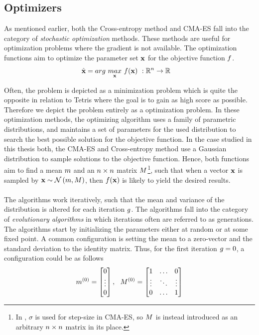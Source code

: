 \subsection{Optimizers \label{Optimizers}}

As mentioned earlier, both the Cross-entropy method and CMA-ES fall into the category of 
\textit{stochastic optimization}
methods. These methods are useful for 
optimization problems where the gradient is not available.
The optimization functions aim to optimize 
the parameter set $\textbf{x}$
for the objective function $f$.
\begin{align}
\hat{\textbf{\individual }} &= 
arg \  \underset{\textbf{\individual }}{max} \  
\fitnessFunction (\textbf{\individual }) \ 
:\mathbb{R}^{\dimensions } \rightarrow \mathbb{R}
\end{align}

Often, the problem is depicted as a minimization problem which is quite
the opposite in relation to Tetris where the goal is to gain as high score as possible.
Therefore we depict the problem entirely as a optimization problem.
In these optimization methods, the optimizing algorithm uses a family of parametric distributions,
and maintains a set of parameters for the used distribution
to search the best possible solution for the objective function.  
In the case studied in this thesis
both, the CMA-ES and Cross-entropy method use a 
Gaussian distribution to sample solutions to the objective function.
Hence, both functions aim to find a mean 
$m $ and an $n \times n$ matrix 
$M $\footnote{In \citep{hansen2011}, 
$\sigma$ is used for step-size in CMA-ES, so $M $ is instead introduced
as an arbitrary $n \times n$ matrix in its place.}, such that when
a vector $\textbf{x}$ is sampled by 
$\textbf{x} \sim \mathcal{N}\left( m, M \right)$, 
then $f (\textbf{x})$ 
is likely to yield the desired results.\\
\\
The algorithms work iteratively, such that the mean and variance 
of the distribution 
is altered for each iteration $g$.
The algorithms fall into the category of \textit{evolutionary algorithms}
in which iterations often are referred  to as generations.
The algorithms start by initializing the 
parameters either at random or at some fixed point. A common 
configuration is setting the mean to 
a zero-vector and the standard deviation to the identity matrix.
Thus, for the first iteration $g = 0$, a configuration could be as follows
\begin{align}
\mean^{(0)} =
\begin{bmatrix}
0\\
\vdots\\
0
\end{bmatrix},\ \ 
\varianceMatrix^{(0)} = 
\begin{bmatrix}
1 & \hdots & 0\\
\vdots & \ddots & \vdots\\
0 & \hdots & 1
\end{bmatrix}
\end{align}

